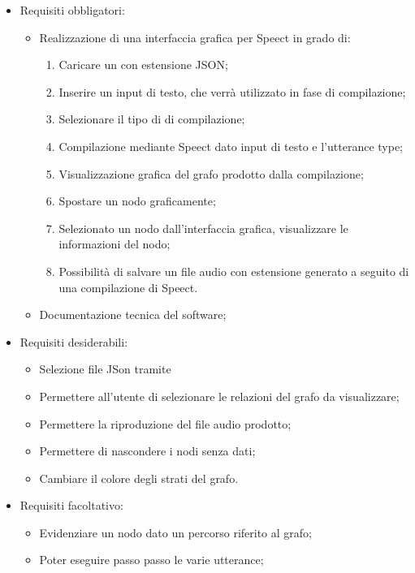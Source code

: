 \documentclass[../AnalisideiRequisiti.tex]{subfiles}
\begin{document}
\begin{itemize}
	\item{} Requisiti obbligatori:
	\begin{itemize}
		\item{}Realizzazione di una interfaccia grafica per Speect in grado di:
		\begin{enumerate}
			\item{} Caricare un  con estensione JSON;
			\item{} Inserire un input di testo, che verrà utilizzato in fase di compilazione;
			\item{} Selezionare il tipo di  di compilazione;
			\item{} Compilazione mediante Speect dato input di testo e l'utterance type;
			\item{} Visualizzazione grafica del grafo prodotto dalla compilazione;
			\item{} Spostare un nodo graficamente;
			\item{} Selezionato un nodo dall'interfaccia grafica, visualizzare le informazioni del nodo;
			\item{} Possibilità di salvare un file audio con estensione  generato a seguito di una compilazione di Speect.
		\end{enumerate}
		\item{}	Documentazione tecnica del software;
	\end{itemize}
	\item{} Requisiti desiderabili:
	\begin{itemize}
		\item{} Selezione file JSon tramite 
		\item{} Permettere all'utente di selezionare le relazioni del grafo da visualizzare;
		\item{} Permettere la riproduzione del file audio prodotto;
		\item{} Permettere di nascondere i nodi senza dati;
		\item{} Cambiare il colore degli strati del grafo.
	\end{itemize}
	\item{} Requisiti facoltativo:
	\begin{itemize}
		\item{} Evidenziare un nodo dato un percorso riferito al grafo;
		\item{} Poter eseguire passo passo le varie utterance;

\end{itemize}
\end{itemize}
\end{document}
